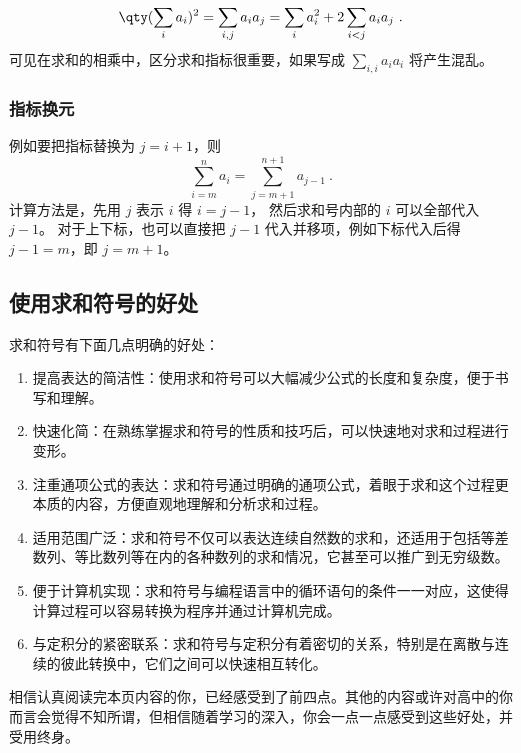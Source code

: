\begin{equation}
\qty(\sum_i a_i)^2 = \sum_{i,j} a_i a_j = \sum_i a_i^2 + 2\sum_{i<j} a_i a_j~.
\end{equation}
可见在求和的相乘中，区分求和指标很重要，如果写成 $\sum\limits_{i,i} a_i a_i$ 将产生混乱。


\subsubsection{指标换元}

例如要把指标替换为 $j=i+1$，则
\begin{equation}
\sum_{i=m}^n a_i = \sum_{j=m+1}^{n+1} a_{j-1} ~.
\end{equation}
计算方法是，先用 $j$ 表示 $i$ 得 $i=j-1$， 然后求和号内部的 $i$ 可以全部代入 $j-1$。 对于上下标，也可以直接把 $j-1$ 代入并移项，例如下标代入后得 $j-1=m$，即 $j=m+1$。


\subsection{使用求和符号的好处}

求和符号有下面几点明确的好处：

\begin{enumerate}
\item 提高表达的简洁性：使用求和符号可以大幅减少公式的长度和复杂度，便于书写和理解。
\item 快速化简：在熟练掌握求和符号的性质和技巧后，可以快速地对求和过程进行变形。
\item 注重通项公式的表达：求和符号通过明确的通项公式，着眼于求和这个过程更本质的内容，方便直观地理解和分析求和过程。
\item 适用范围广泛：求和符号不仅可以表达连续自然数的求和，还适用于包括等差数列、等比数列等在内的各种数列的求和情况，它甚至可以推广到无穷级数。
\item 便于计算机实现：求和符号与编程语言中的循环语句的条件一一对应，这使得计算过程可以容易转换为程序并通过计算机完成。
\item 与定积分的紧密联系：求和符号与定积分有着密切的关系，特别是在离散与连续的彼此转换中，它们之间可以快速相互转化。
\end{enumerate}

相信认真阅读完本页内容的你，已经感受到了前四点。其他的内容或许对高中的你而言会觉得不知所谓，但相信随着学习的深入，你会一点一点感受到这些好处，并受用终身。